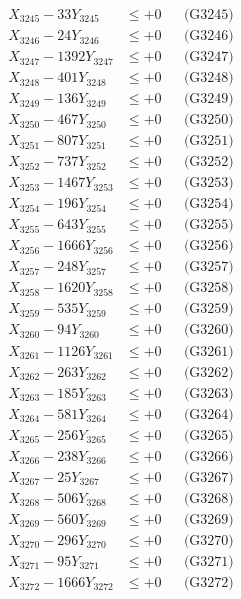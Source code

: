 \documentclass[a4paper,10pt]{article}
\begin{document}
{\begin{align}
X_{3245} - 33Y_{3245} &\leq +0 && \text{(G3245)} \\
X_{3246} - 24Y_{3246} &\leq +0 && \text{(G3246)} \\
X_{3247} - 1392Y_{3247} &\leq +0 && \text{(G3247)} \\
X_{3248} - 401Y_{3248} &\leq +0 && \text{(G3248)} \\
X_{3249} - 136Y_{3249} &\leq +0 && \text{(G3249)} \\
X_{3250} - 467Y_{3250} &\leq +0 && \text{(G3250)} \\
\allowbreak
X_{3251} - 807Y_{3251} &\leq +0 && \text{(G3251)} \\
X_{3252} - 737Y_{3252} &\leq +0 && \text{(G3252)} \\
X_{3253} - 1467Y_{3253} &\leq +0 && \text{(G3253)} \\
X_{3254} - 196Y_{3254} &\leq +0 && \text{(G3254)} \\
X_{3255} - 643Y_{3255} &\leq +0 && \text{(G3255)} \\
X_{3256} - 1666Y_{3256} &\leq +0 && \text{(G3256)} \\
X_{3257} - 248Y_{3257} &\leq +0 && \text{(G3257)} \\
X_{3258} - 1620Y_{3258} &\leq +0 && \text{(G3258)} \\
X_{3259} - 535Y_{3259} &\leq +0 && \text{(G3259)} \\
X_{3260} - 94Y_{3260} &\leq +0 && \text{(G3260)} \\
\allowbreak
X_{3261} - 1126Y_{3261} &\leq +0 && \text{(G3261)} \\
X_{3262} - 263Y_{3262} &\leq +0 && \text{(G3262)} \\
X_{3263} - 185Y_{3263} &\leq +0 && \text{(G3263)} \\
X_{3264} - 581Y_{3264} &\leq +0 && \text{(G3264)} \\
X_{3265} - 256Y_{3265} &\leq +0 && \text{(G3265)} \\
X_{3266} - 238Y_{3266} &\leq +0 && \text{(G3266)} \\
X_{3267} - 25Y_{3267} &\leq +0 && \text{(G3267)} \\
X_{3268} - 506Y_{3268} &\leq +0 && \text{(G3268)} \\
X_{3269} - 560Y_{3269} &\leq +0 && \text{(G3269)} \\
X_{3270} - 296Y_{3270} &\leq +0 && \text{(G3270)} \\
\allowbreak
X_{3271} - 95Y_{3271} &\leq +0 && \text{(G3271)} \\
X_{3272} - 1666Y_{3272} &\leq +0 && \text{(G3272)} \\

\end{align}}
\end{document}
